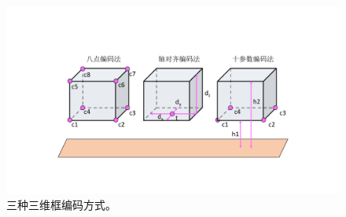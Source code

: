 \begin{figure}[t]
	\centering
	\includegraphics[trim={5cm, 3.5cm, 5cm, 4cm}, clip,width=\textwidth]{imgs/box-encoding.pdf}
	\caption{三种三维框编码方式。}
	\label{fig:box_encoding}
\end{figure}

